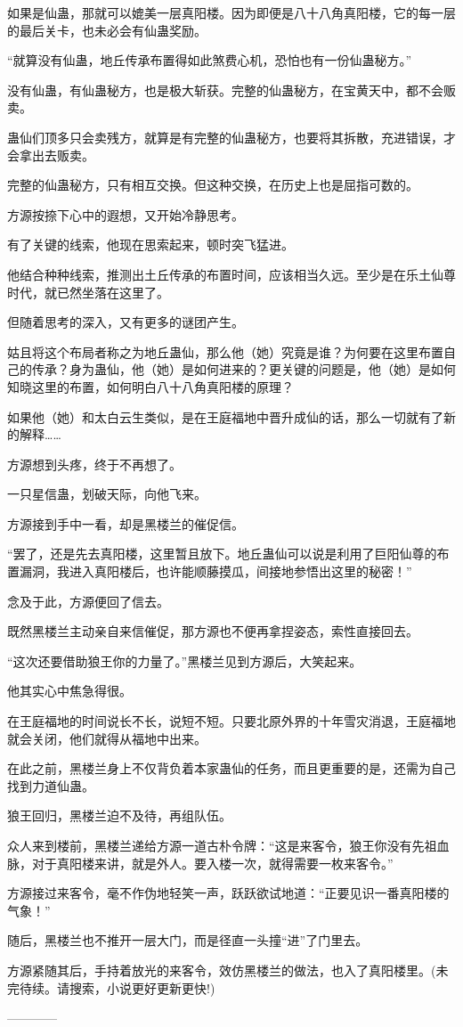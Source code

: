 \begin{this_body}
如果是仙蛊，那就可以媲美一层真阳楼。因为即便是八十八角真阳楼，它的每一层的最后关卡，也未必会有仙蛊奖励。

“就算没有仙蛊，地丘传承布置得如此煞费心机，恐怕也有一份仙蛊秘方。”

没有仙蛊，有仙蛊秘方，也是极大斩获。完整的仙蛊秘方，在宝黄天中，都不会贩卖。

蛊仙们顶多只会卖残方，就算是有完整的仙蛊秘方，也要将其拆散，充进错误，才会拿出去贩卖。

完整的仙蛊秘方，只有相互交换。但这种交换，在历史上也是屈指可数的。

方源按捺下心中的遐想，又开始冷静思考。

有了关键的线索，他现在思索起来，顿时突飞猛进。

他结合种种线索，推测出土丘传承的布置时间，应该相当久远。至少是在乐土仙尊时代，就已然坐落在这里了。

但随着思考的深入，又有更多的谜团产生。

姑且将这个布局者称之为地丘蛊仙，那么他（她）究竟是谁？为何要在这里布置自己的传承？身为蛊仙，他（她）是如何进来的？更关键的问题是，他（她）是如何知晓这里的布置，如何明白八十八角真阳楼的原理？

如果他（她）和太白云生类似，是在王庭福地中晋升成仙的话，那么一切就有了新的解释……

方源想到头疼，终于不再想了。

一只星信蛊，划破天际，向他飞来。

方源接到手中一看，却是黑楼兰的催促信。

“罢了，还是先去真阳楼，这里暂且放下。地丘蛊仙可以说是利用了巨阳仙尊的布置漏洞，我进入真阳楼后，也许能顺藤摸瓜，间接地参悟出这里的秘密！”

念及于此，方源便回了信去。

既然黑楼兰主动亲自来信催促，那方源也不便再拿捏姿态，索性直接回去。

“这次还要借助狼王你的力量了。”黑楼兰见到方源后，大笑起来。

他其实心中焦急得很。

在王庭福地的时间说长不长，说短不短。只要北原外界的十年雪灾消退，王庭福地就会关闭，他们就得从福地中出来。

在此之前，黑楼兰身上不仅背负着本家蛊仙的任务，而且更重要的是，还需为自己找到力道仙蛊。

狼王回归，黑楼兰迫不及待，再组队伍。

众人来到楼前，黑楼兰递给方源一道古朴令牌：“这是来客令，狼王你没有先祖血脉，对于真阳楼来讲，就是外人。要入楼一次，就得需要一枚来客令。”

方源接过来客令，毫不作伪地轻笑一声，跃跃欲试地道：“正要见识一番真阳楼的气象！”

随后，黑楼兰也不推开一层大门，而是径直一头撞“进”了门里去。

方源紧随其后，手持着放光的来客令，效仿黑楼兰的做法，也入了真阳楼里。(未完待续。请搜索，小说更好更新更快!)

------------

\end{this_body}

